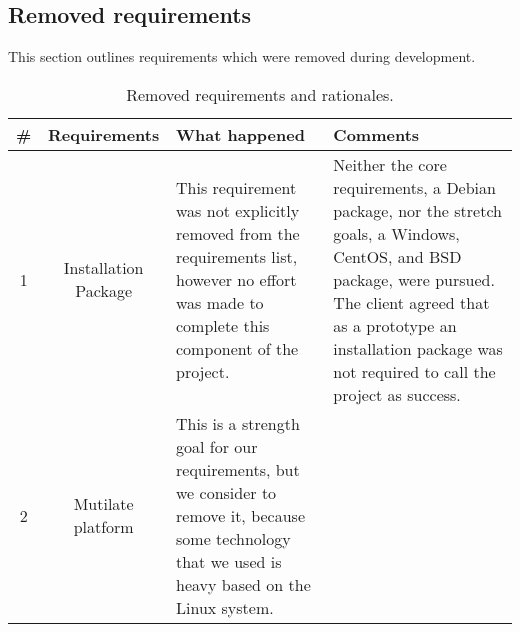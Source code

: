 \subsection{Removed requirements}

This section outlines requirements which were removed during development.

\begin{table}[H]
  \begin{center}
    \begin{tabular}{ | c | c | p{7cm} | p{6cm} | }
      \hline
      \# & Requirements & What happened & Comments \\ \hline
      1 & Installation Package &
        This requirement was not explicitly removed from the requirements list, however no effort was made to complete this component of the project. & 
        Neither the core requirements, a Debian package, nor the stretch goals, a Windows, CentOS, and BSD package, were pursued.
        The client agreed that as a prototype an installation package was not required to call the project as success. \\ \hline
      2 & Mutilate platform  &
        This is a strength goal for our requirements, but we consider to remove it, because some technology that we used is heavy based on the Linux system.
    \end{tabular}
  \end{center}
  \caption{Removed requirements and rationales.}
\end{table}
